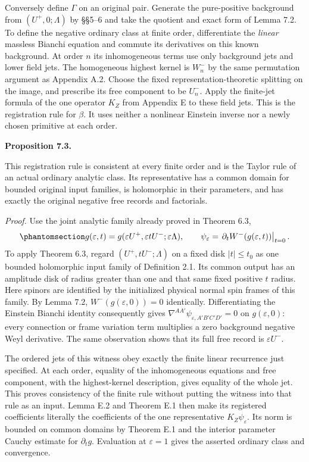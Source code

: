\documentclass[
  english,
  11pt,
  reqno]{amsart}
\makeatletter
\newcommand{\pandocstatementheading}[1]{%
  \par\addpenalty{\@beginparpenalty}%
  \addvspace{.5\baselineskip plus .2\baselineskip minus .2\baselineskip}%
  {\normalfont\bfseries #1\par}%
  \nobreak\@afterindenttrue\@afterheading
}
\makeatother
\begin{document}
Conversely define \(\Gamma\) on an original pair. Generate the
pure-positive background from \((U^+,0;\Lambda)\) by §§5--6 and take the
quotient and exact form of Lemma 7.2. To define the negative ordinary
class at finite order, differentiate the \emph{linear} massless Bianchi
equation and commute its derivatives on this known background. At order
\(n\) its inhomogeneous terms use only background jets and lower field
jets. The homogeneous highest kernel is \(W_n^-\) by the same
permutation argument as Appendix A.2. Choose the fixed
representation-theoretic splitting on the image, and prescribe its free
component to be \(U_n^-\). Apply the finite-jet formula of the one
operator \(K_Z\) from Appendix E to these field jets. This is the
registration rule for \(\beta\). It uses neither a nonlinear Einstein
inverse nor a newly chosen primitive at each order.

\pandocstatementheading{\protect{}\label{prop:gg-negative-registration-convergence}Proposition 7.3.}

This registration rule is consistent at every finite order and is the
Taylor rule of an actual ordinary analytic class. Its representative has
a common domain for bounded original input families, is holomorphic in
their parameters, and has exactly the original negative free records and
factorials.

\emph{Proof.} Use the joint analytic family already proved in Theorem
6.3,
\begin{equation}\protect\phantomsection\label{eq:gg-negative-registration-witness}{
 g(\varepsilon,t)=g(\varepsilon U^+,\varepsilon tU^-;\varepsilon\Lambda),
 \qquad
 \psi_\varepsilon=
 \left.\partial_t W^-\!\left(g(\varepsilon,t)\right)\right|_{t=0}.
}\end{equation} To apply Theorem 6.3, regard \((U^+,tU^-;\Lambda)\) on a
fixed disk \(|t|\le t_0\) as one bounded holomorphic input family of
Definition 2.1. Its common output has an amplitude disk of radius
greater than one and that same fixed positive \(t\) radius. Here spinors
are identified by the initialized physical normal spin frames of this
family. By Lemma 7.2, \(W^-(g(\varepsilon,0))=0\) identically.
Differentiating the Einstein Bianchi identity consequently gives
\(\nabla^{AA'}\psi_{\varepsilon,A'B'C'D'}=0\) on \(g(\varepsilon,0)\):
every connection or frame variation term multiplies a zero background
negative Weyl derivative. The same observation shows that its full free
record is \(\varepsilon U^-\).

The ordered jets of this witness obey exactly the finite linear
recurrence just specified. At each order, equality of the inhomogeneous
equations and free component, with the highest-kernel description, gives
equality of the whole jet. This proves consistency of the finite rule
without putting the witness into that rule as an input. Lemma E.2 and
Theorem E.1 then make its registered coefficients literally the
coefficients of the one representative \(K_Z\psi_\varepsilon\). Its norm
is bounded on common domains by Theorem E.1 and the interior parameter
Cauchy estimate for \(\partial_tg\). Evaluation at \(\varepsilon=1\)
gives the asserted ordinary class and convergence.
\end{document}
